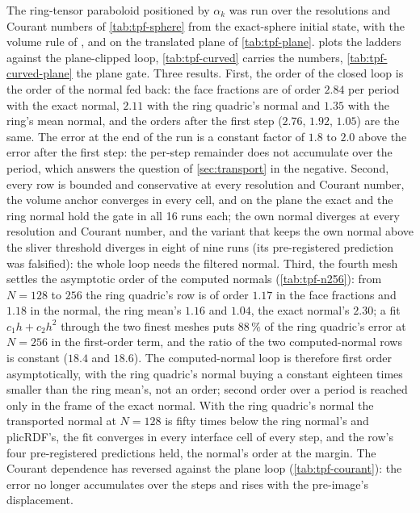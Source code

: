 The ring-tensor paraboloid positioned by $\alpha_k$ was run over the resolutions and Courant numbers of \cref{tab:tpf-sphere} from the exact-sphere initial state, with the volume rule of \citet{KromerBothe2023Init}, and on the translated plane of \cref{tab:tpf-plane}.  plots the ladders against the plane-clipped loop, \cref{tab:tpf-curved} carries the numbers, \cref{tab:tpf-curved-plane} the plane gate. Three results. First, the order of the closed loop is the order of the normal fed back: the face fractions are of order $2.84$ per period with the exact normal, $2.11$ with the ring quadric's normal and $1.35$ with the ring's mean normal, and the orders after the first step ($2.76$, $1.92$, $1.05$) are the same. The error at the end of the run is a constant factor of $1.8$ to $2.0$ above the error after the first step: the per-step remainder does not accumulate over the period, which answers the question of \cref{sec:transport} in the negative. Second, every row is bounded and conservative at every resolution and Courant number, the volume anchor converges in every cell, and on the plane the exact and the ring normal hold the gate in all 16 runs each; the own normal diverges at every resolution and Courant number, and the variant that keeps the own normal above the sliver threshold diverges in eight of nine runs (its pre-registered prediction was falsified): the whole loop needs the filtered normal. Third, the fourth mesh settles the asymptotic order of the computed normals (\cref{tab:tpf-n256}): from $N = 128$ to $256$ the ring quadric's row is of order $1.17$ in the face fractions and $1.18$ in the normal, the ring mean's $1.16$ and $1.04$, the exact normal's $2.30$; a fit $c_1 h + c_2 h^2$ through the two finest meshes puts $88\,\%$ of the ring quadric's error at $N = 256$ in the first-order term, and the ratio of the two computed-normal rows is constant ($18.4$ and $18.6$). The computed-normal loop is therefore first order asymptotically, with the ring quadric's normal buying a constant eighteen times smaller than the ring mean's, not an order; second order over a period is reached only in the frame of the exact normal. With the ring quadric's normal the transported normal at $N = 128$ is fifty times below the ring normal's and plicRDF's, the fit converges in every interface cell of every step, and the row's four pre-registered predictions held, the normal's order at the margin. The Courant dependence has reversed against the plane loop (\cref{tab:tpf-courant}): the error no longer accumulates over the steps and rises with the pre-image's displacement.

